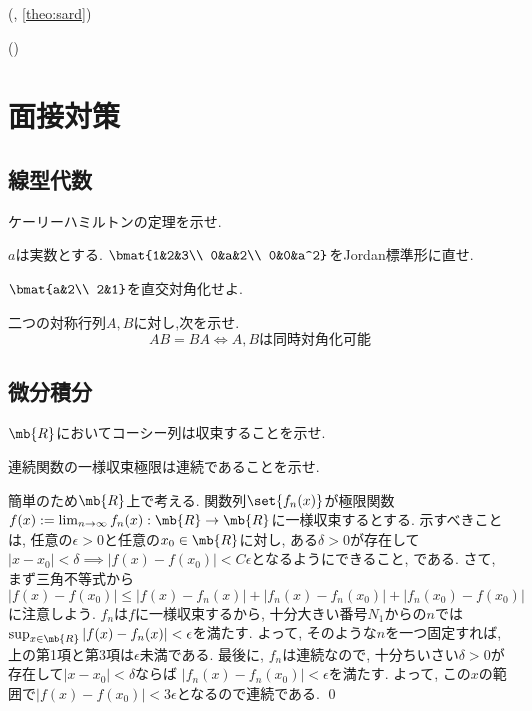 \begin{theo} (, \ref{theo:sard})

\end{theo}

\begin{theo} (\tf{})

\end{theo}


\newpage 

\section{面接対策}
\subsection{線型代数}
\begin{prob}
ケーリーハミルトンの定理を示せ. 
\end{prob}


\begin{prob}
$a$は実数とする.  $\bmat{1&2&3\\
0&a&2\\
0&0&a^2}$をJordan標準形に直せ. 
\end{prob}

\begin{prob}
$\bmat{a&2\\ 2&1}$を直交対角化せよ. 
\end{prob}

\begin{prob}
二つの対称行列$A,B$に対し,次を示せ. 
\[AB = BA \iff A,Bは同時対角化可能\]
\end{prob}



\subsection{微分積分}

\begin{prob}
$\mb{R}$においてコーシー列は収束することを示せ. 
\end{prob}

\begin{prob}
連続関数の一様収束極限は連続であることを示せ. 
\end{prob}
\begin{ans}
簡単のため$\mb{R}$上で考える. 関数列$\set{f_n(x)}$が極限関数$f(x) := \lim_{n\to \infty} f_n(x): \mb{R}\to \mb{R}$に一様収束するとする. 示すべきことは, 任意の$\epsilon > 0$と任意の$x_0 \in \mb{R}$に対し, ある$\delta>0$が存在して$|x-x_0|<\delta \implies |f(x) - f(x_0)| < C\epsilon$となるようにできること, である. さて, まず三角不等式から
\[|f(x) - f(x_0)| \leq |f(x) - f_n(x)| + |f_n(x) - f_n(x_0)| + |f_n(x_0) - f(x_0)|\]
に注意しよう. $f_n$は$f$に一様収束するから, 十分大きい番号$N_1$からの$n$では$\sup_{x\in \mb{R}}|f(x) - f_n(x)| < \epsilon$を満たす. よって, そのような$n$を一つ固定すれば, 上の第1項と第3項は$\epsilon$未満である. 最後に, $f_n$は連続なので, 十分ちいさい$\delta>0$が存在して$|x-x_0| < \delta$ならば $|f_n(x) - f_n(x_0)| < \epsilon$を満たす. よって, この$x$の範囲で$|f(x) - f(x_0)| < 3\epsilon$となるので連続である. \qed 

\end{ans}

